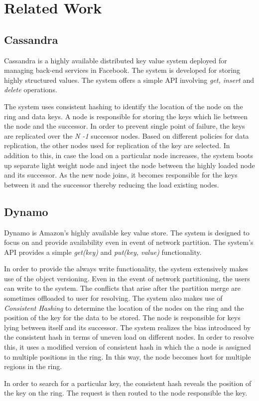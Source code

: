 \documentclass[12pt,a4paper,twoside,openright]{book}
\begin{document}
\chapter{Related Work}
\label{chap:related_work}



\section{Cassandra}
Cassandra \cite{cassandra} is a highly available distributed key value system deployed for managing back-end services in Facebook. The system is developed for storing highly structured values. The system offers a simple API involving \textit{get, insert} and \textit{delete} operations.
\par The system uses consistent hashing to identify the location of the node on the ring and data keys. A node is responsible for storing the keys which lie between the node and the successor. In order to prevent single point of failure, the keys are replicated over the \textit{N -1} successor nodes. Based on different policies for data replication, the other nodes used for replication of the key are selected. In addition to this, in case the load on a particular node increases, the system boots up separate light weight node and inject the node between the highly loaded node and its successor. As the new node joins, it becomes responsible for the keys between it and the successor thereby reducing the load existing nodes.

\section{Dynamo}
Dynamo \cite{dynamo} is Amazon's highly available key value store. The system is designed to focus on and provide availability even in event of network partition. The system's API provides a simple \textit{get(key)} and \textit{put(key, value)} functionality. 

\par In order to provide the always write functionality, the system extensively makes use of the object versioning. Even in the event of network partitioning, the users can write to the system. The conflicts that arise after the partition merge are sometimes offloaded to user for resolving. The system also makes use of \textit{Consistent Hashing} to determine the location of the nodes on the ring and the position of the key for the data to be stored. The node is responsible for keys lying between itself and its successor. The system realizes the bias introduced by the consistent hash in terms of uneven load on different nodes. In order to resolve this, it uses a modified version of consistent hash in which the a node is assigned to multiple positions in the ring. In this way, the node becomes host for multiple regions in the ring.
\par In order to search for a particular key, the consistent hash reveals the position of the key on the ring. The request is then routed to the node responsible the key. 
\end{document}
